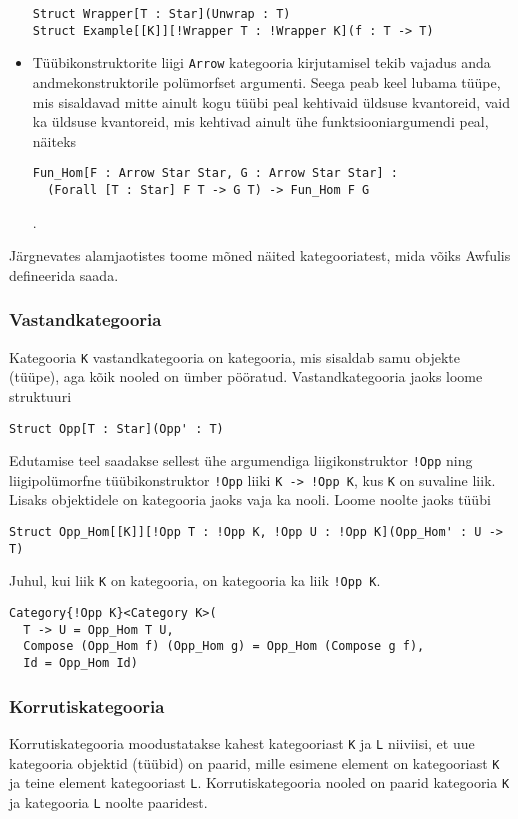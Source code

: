 \documentclass[12pt]{article}
\begin{document}
\begin{itemize}
            \begin{verbatim}Struct Wrapper[T : Star](Unwrap : T)
Struct Example[[K]][!Wrapper T : !Wrapper K](f : T -> T)\end{verbatim}
          \item
            Tüübikonstruktorite liigi \verb!Arrow! kategooria kirjutamisel tekib vajadus anda andmekonstruktorile polümorfset argumenti. Seega peab keel lubama tüüpe, mis sisaldavad mitte ainult kogu tüübi peal kehtivaid üldsuse kvantoreid, vaid ka üldsuse kvantoreid, mis kehtivad ainult ühe funktsiooniargumendi peal, näiteks

            \begin{verbatim}Fun_Hom[F : Arrow Star Star, G : Arrow Star Star] :
  (Forall [T : Star] F T -> G T) -> Fun_Hom F G\end{verbatim}.
        \end{itemize}

        Järgnevates alamjaotistes toome mõned näited kategooriatest, mida võiks Awfulis defineerida saada.
      \subsubsection{Vastandkategooria}
        Kategooria \verb!K! vastandkategooria on kategooria, mis sisaldab samu objekte (tüüpe), aga kõik nooled on ümber pööratud. Vastandkategooria jaoks loome struktuuri

        \begin{verbatim}Struct Opp[T : Star](Opp' : T)\end{verbatim}

        Edutamise teel saadakse sellest ühe argumendiga liigikonstruktor \verb"!Opp" ning liigipolümorfne tüübikonstruktor \verb"!Opp" liiki \verb"K -> !Opp K", kus \verb!K! on suvaline liik. Lisaks objektidele on kategooria jaoks vaja ka nooli. Loome noolte jaoks tüübi

        \begin{verbatim}Struct Opp_Hom[[K]][!Opp T : !Opp K, !Opp U : !Opp K](Opp_Hom' : U -> T)\end{verbatim}

        Juhul, kui liik \verb!K! on kategooria, on kategooria ka liik \verb"!Opp K".

        \begin{verbatim}Category{!Opp K}<Category K>(
  T -> U = Opp_Hom T U,
  Compose (Opp_Hom f) (Opp_Hom g) = Opp_Hom (Compose g f),
  Id = Opp_Hom Id)\end{verbatim}
      \subsubsection{Korrutiskategooria}
        Korrutiskategooria moodustatakse kahest kategooriast \verb!K! ja \verb!L! niiviisi, et uue kategooria objektid (tüübid) on paarid, mille esimene element on kategooriast \verb!K! ja teine element kategooriast \verb!L!. Korrutiskategooria nooled on paarid kategooria \verb!K! ja kategooria \verb!L! noolte paaridest.
\end{document}
